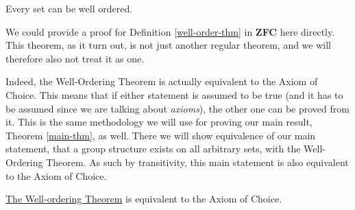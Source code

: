 \documentclass[../../main.tex]{subfiles}
\begin{document}
\begin{definition}\cite[Theorem 15, p.39]{Jec78}\label{well-order-thm}
    \newline Every set can be well ordered.
\end{definition}

We could provide a proof for Definition \ref{well-order-thm} in \textbf{ZFC} here directly.
This theorem, as it turn out, is not just another regular theorem, and we will therefore also not treat it as one.

Indeed, the Well-Ordering Theorem is actually equivalent to the Axiom of Choice.
This means that if either statement is assumed to be true (and it has to be assumed since we are talking about \textit{axioms}),
the other one can be proved from it.
This is the same methodology we will use for proving our main result, Theorem \ref{main-thm}, as well.
There we will show equivalence of our main statement, that a group structure exists on all arbitrary sets, with the Well-Ordering Theorem.
As such by transitivity, this main statement is also equivalent to the Axiom of Choice.

\begin{theorem}
    \hyperref[well-order-thm]{The Well-ordering Theorem} is equivalent to the Axiom of Choice. %
\end{theorem}
\end{document}
